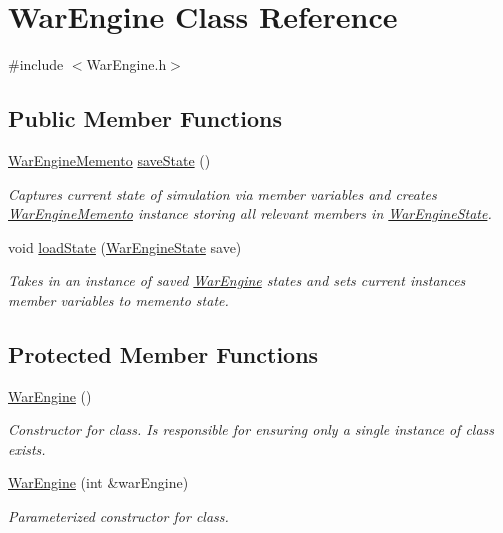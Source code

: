 \hypertarget{classWarEngine}{}\section{War\+Engine Class Reference}
\label{classWarEngine}


{\ttfamily \#include $<$War\+Engine.\+h$>$}

\subsection*{Public Member Functions}
\begin{DoxyCompactItemize}
\item 
\hyperlink{classWarEngineMemento}{War\+Engine\+Memento} \hyperlink{classWarEngine_a3ce98b4a76487348a712a4ffb54a71f2}{save\+State} ()
\begin{DoxyCompactList}\small\item\em Captures current state of simulation via member variables and creates \hyperlink{classWarEngineMemento}{War\+Engine\+Memento} instance storing all relevant members in \hyperlink{classWarEngineState}{War\+Engine\+State}. \end{DoxyCompactList}\item 
void \hyperlink{classWarEngine_a76994dd9d009fff3dd272a87710bfae5}{load\+State} (\hyperlink{classWarEngineState}{War\+Engine\+State} save)
\begin{DoxyCompactList}\small\item\em Takes in an instance of saved \hyperlink{classWarEngine}{War\+Engine} states and sets current instance\textquotesingle{}s member variables to memento state. \end{DoxyCompactList}\end{DoxyCompactItemize}
\subsection*{Protected Member Functions}
\begin{DoxyCompactItemize}
\item 
\mbox{\label{classWarEngine_a3c95a6990a6eabd99f1ea0ade30f85f2}} 
\hyperlink{classWarEngine_a3c95a6990a6eabd99f1ea0ade30f85f2}{War\+Engine} ()
\begin{DoxyCompactList}\small\item\em Constructor for class. Is responsible for ensuring only a single instance of class exists. \end{DoxyCompactList}\item 
\mbox{\label{classWarEngine_a0c3e8e1ca61c1e85ffcbbaa26b9a749c}} 
\hyperlink{classWarEngine_a0c3e8e1ca61c1e85ffcbbaa26b9a749c}{War\+Engine} (int \&war\+Engine)
\begin{DoxyCompactList}\small\item\em Parameterized constructor for class. \end{DoxyCompactList}\end{DoxyCompactItemize}



